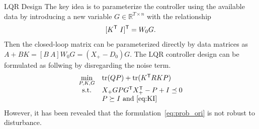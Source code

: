 \documentclass[aspectratio=169, handout, 10pt, hyperref=colorlinks]{beamer}
\begin{document}
\begin{frame}[allowframebreaks]{LQR Design}
The key idea is to parameterize the controller using the available data by introducing a new variable $G\in\mathbb{R}^{T\times n}$ with the relationship
\begin{equation}\label{eq:KI}
[K^{\sf T}\ I]^{\sf T}
=W_0G.
\end{equation}
Then the closed-loop matrix can be parameterized directly by data matrices as
$A+BK = [B\ A]W_0G = (X_+-D_0)G.$
The LQR controller design can be formulated as follwing by disregarding the noise term.
\begin{equation}\label{eq:prob_ori}
\begin{array}{cl}
 \displaystyle{\min_{P,K,G}} & \operatorname{tr}(QP)+\operatorname{tr}(K^{\sf T}RKP)\\
 {\rm s.t.} & X_+GPG^{\sf T}X_+^{\sf T}-P+I\preceq 0\\
  & P \succeq I\ {\rm and}\ \eqref{eq:KI}
\end{array}
\end{equation}
However, it has been revealed that the formulation~\eqref{eq:prob_ori} is not robust to disturbance.


\end{frame}
\end{document}

